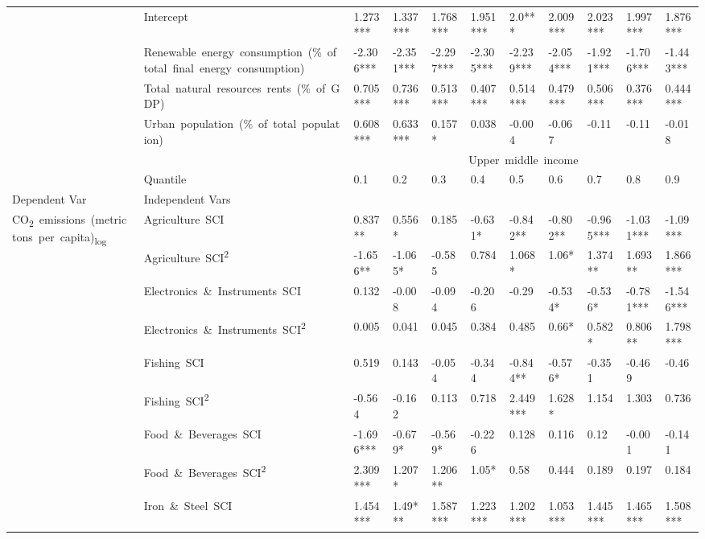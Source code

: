 \documentclass[10pt]{article}
\begin{document}
\begin{table}[ht]
\begin{adjustbox}{width=\textwidth,center}
\begin{tabular}{lllllllllll}
      & Intercept & 1.273*** & 1.337*** & 1.768*** & 1.951*** & 2.0*** & 2.009*** & 2.023*** & 1.997*** & 1.876*** \\
      & Renewable\ energy\ consumption\ (\%\ of\ total\ final\ energy\ consumption) & -2.306*** & -2.351*** & -2.297*** & -2.305*** & -2.239*** & -2.054*** & -1.921*** & -1.706*** & -1.443*** \\
      & Total\ natural\ resources\ rents\ (\%\ of\ GDP) & 0.705*** & 0.736*** & 0.513*** & 0.407*** & 0.514*** & 0.479*** & 0.506*** & 0.376*** & 0.444*** \\
      & Urban\ population\ (\%\ of\ total\ population) & 0.608*** & 0.633*** & 0.157* & 0.038 & -0.004 & -0.067 & -0.11 & -0.11 & -0.018 \\
	\toprule
      &  & \multicolumn{9}{c}{Upper\ middle\ income} \\
      & Quantile & 0.1 & 0.2 & 0.3 & 0.4 & 0.5 & 0.6 & 0.7 & 0.8 & 0.9 \\
      Dependent Var & Independent Vars &  &  &  &  &  &  &  &  &  \\
      \midrule
      \multirow[t]{31}{*}{CO\textsubscript{2}\ emissions\ (metric\ tons\ per\ capita)\textsubscript{log}} & Agriculture\ SCI & 0.837** & 0.556* & 0.185 & -0.631* & -0.842** & -0.802** & -0.965*** & -1.031*** & -1.09*** \\
      & Agriculture\ SCI\textsuperscript{2} & -1.656** & -1.065* & -0.585 & 0.784 & 1.068* & 1.06* & 1.374** & 1.693** & 1.866*** \\
      & Electronics\ \&\ Instruments\ SCI & 0.132 & -0.008 & -0.094 & -0.206 & -0.29 & -0.534* & -0.536* & -0.781*** & -1.546*** \\
      & Electronics\ \&\ Instruments\ SCI\textsuperscript{2} & 0.005 & 0.041 & 0.045 & 0.384 & 0.485 & 0.66* & 0.582* & 0.806** & 1.798*** \\
      & Fishing\ SCI & 0.519 & 0.143 & -0.054 & -0.344 & -0.844** & -0.576* & -0.351 & -0.469 & -0.46 \\
      & Fishing\ SCI\textsuperscript{2} & -0.564 & -0.162 & 0.113 & 0.718 & 2.449*** & 1.628* & 1.154 & 1.303 & 0.736 \\
      & Food\ \&\ Beverages\ SCI & -1.696*** & -0.679* & -0.569* & -0.226 & 0.128 & 0.116 & 0.12 & -0.001 & -0.141 \\
      & Food\ \&\ Beverages\ SCI\textsuperscript{2} & 2.309*** & 1.207* & 1.206** & 1.05* & 0.58 & 0.444 & 0.189 & 0.197 & 0.184 \\
      & Iron\ \&\ Steel\ SCI & 1.454*** & 1.49*** & 1.587*** & 1.223*** & 1.202*** & 1.053*** & 1.445*** & 1.465*** & 1.508*** \\

\end{tabular}
\end{adjustbox}
\end{table}
\end{document}
